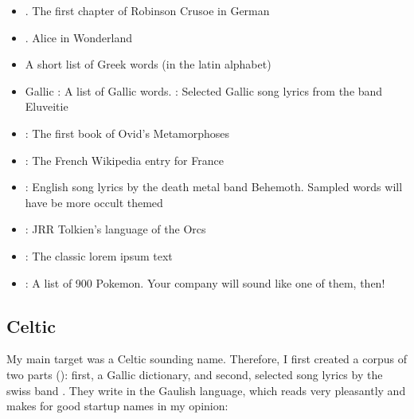 \documentclass[letterpaper,10pt,english]{sphinxmanual}
\begin{document}
\begin{itemize}
\item {} 
.
The first chapter of Robinson Crusoe in German

\item {} 
.
Alice in Wonderland

\item {} 
A short list of Greek words (in the latin alphabet)

\item {} 
Gallic : A list of Gallic words. : Selected Gallic song lyrics from the band Eluveitie

\item {} 
:
The first book of Ovid’s Metamorphoses

\item {} 
:
The French Wikipedia entry for France

\item {} 
:
English song lyrics by the death metal band Behemoth. Sampled words will have be more occult themed

\item {} 
:
JRR Tolkien’s language of the Orcs

\item {} 
:
The classic lorem ipsum text

\item {} 
:
A list of 900 Pokemon. Your company will sound like one of them, then!

\end{itemize}


\subsection{Celtic}
\label{\detokenize{introduction:celtic}}
My main target was a Celtic sounding name. Therefore, I first created a corpus of two parts (): first, a Gallic dictionary, and second, selected song lyrics by the swiss band . They write in the Gaulish language, which reads very pleasantly and makes for good startup names in my opinion:
\end{document}

